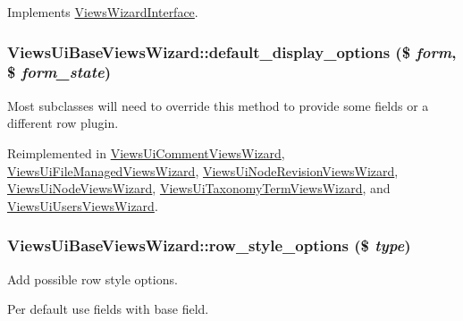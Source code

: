 Implements \hyperlink{interfaceViewsWizardInterface_a29dcb9af9b511509bba69e55b643edc0}{ViewsWizardInterface}.\hypertarget{classViewsUiBaseViewsWizard_a862c9e72a5e11fd78baa1992581f1410}{
\subsubsection[{default\_\-display\_\-options}]{\setlength{\rightskip}{0pt plus 5cm}ViewsUiBaseViewsWizard::default\_\-display\_\-options (\$ {\em form}, \/  \$ {\em form\_\-state})}}
\label{classViewsUiBaseViewsWizard_a862c9e72a5e11fd78baa1992581f1410}
Most subclasses will need to override this method to provide some fields or a different row plugin. 

Reimplemented in \hyperlink{classViewsUiCommentViewsWizard_ab644e65b579971fca2ea8c66405f805f}{ViewsUiCommentViewsWizard}, \hyperlink{classViewsUiFileManagedViewsWizard_adfc4a62bbd34d2d231a288cdf6bbfd93}{ViewsUiFileManagedViewsWizard}, \hyperlink{classViewsUiNodeRevisionViewsWizard_ac51b61da9be3e950479313ffb4135546}{ViewsUiNodeRevisionViewsWizard}, \hyperlink{classViewsUiNodeViewsWizard_a9272513dd5d6fc4bebfb85859cda7188}{ViewsUiNodeViewsWizard}, \hyperlink{classViewsUiTaxonomyTermViewsWizard_a167a991a251ca4cd9958552134095511}{ViewsUiTaxonomyTermViewsWizard}, and \hyperlink{classViewsUiUsersViewsWizard_ac9649ee6a7b0234dc1f7d78948ac1285}{ViewsUiUsersViewsWizard}.\hypertarget{classViewsUiBaseViewsWizard_af5c8d4b868a5bf71075c373af3a96252}{
\subsubsection[{row\_\-style\_\-options}]{\setlength{\rightskip}{0pt plus 5cm}ViewsUiBaseViewsWizard::row\_\-style\_\-options (\$ {\em type})}}
\label{classViewsUiBaseViewsWizard_af5c8d4b868a5bf71075c373af3a96252}
Add possible row style options.

Per default use fields with base field. 

